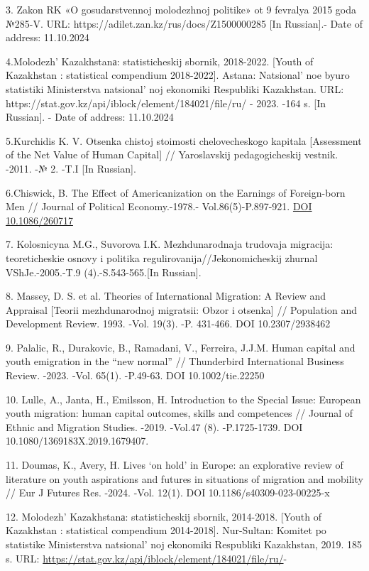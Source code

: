 3. Zakon RK «O gosudarstvennoj molodezhnoj politike» ot 9 fevralya 2015
goda №285-V. URL: https://adilet.zan.kz/rus/docs/Z1500000285 {[}In
Russian{]}.- Date of address: 11.10.2024

4.Molodezh'{} Kazakhstanа: statisticheskij sbornik,
2018-2022. {[}Youth of Kazakhstan : statistical compendium 2018-2022{]}.
Astana: Natsional' noe byuro statistiki Ministerstva
natsional' noj ekonomiki Respubliki Kazakhstan. URL:
https://stat.gov.kz/api/iblock/element/184021/file/ru/ - 2023. -164 s.
{[}In Russian{]}. - Date of address: 11.10.2024

5.Kurchidis K. V. Otsenka chistoj stoimosti chelovecheskogo kapitala
{[}Assessment of the Net Value of Human Capital{]} // Yaroslavskij
pedagogicheskij vestnik. -2011. -№ 2. -T.I {[}In Russian{]}.

6.Chiswick, B. The Effect of Americanization on the Earnings of
Foreign-born Men // Journal of Political Economy.-1978.-
Vol.86(5)-P.897-921.
\href{https://econpapers.repec.org/scripts/redir.pf?u=http\%3A\%2F\%2Fdx.doi.org\%2F10.1086\%2F260717;h=repec:ucp:jpolec:v:86:y:1978:i:5:p:897-921}{DOI
10.1086/260717}~

7. Kolosnicyna M.G., Suvorova I.K. Mezhdunarodnaja trudovaja migracija:
teoreticheskie osnovy i politika regulirovanija//Jekonomicheskij zhurnal
VShJe.-2005.-T.9 (4).-S.543-565.{[}In Russian{]}.

8. Massey, D. S. et al. Theories of International Migration: A Review
and Appraisal {[}Teorii mezhdunarodnoj migratsii: Obzor i otsenka{]} //
Population and Development Review. 1993. -Vol. 19(3). -P. 431-466. DOI
10.2307/2938462

9. Palalic, R., Durakovic, B., Ramadani, V., Ferreira, J.J.M. Human
capital and youth emigration in the ``new normal'' // Thunderbird
International Business Review. -2023. -Vol. 65(1). -P.49-63. DOI
10.1002/tie.22250

10. Lulle, A., Janta, H., Emilsson, H. Introduction to the Special
Issue: European youth migration: human capital outcomes, skills and
competences // Journal of Ethnic and Migration Studies. -2019. -Vol.47
(8). -P.1725-1739. DOI 10.1080/1369183X.2019.1679407.

11. Doumas, K., Avery, H. Lives `on hold' in Europe: an explorative
review of literature on youth aspirations and futures in situations of
migration and mobility // Eur J Futures Res. -2024. -Vol. 12(1). DOI
10.1186/s40309-023-00225-x

12. Molodezh'{} Kazakhstanа: statisticheskij sbornik,
2014-2018. {[}Youth of Kazakhstan : statistical compendium 2014-2018{]}.
Nur-Sultan: Komitet po statistike Ministerstva
natsional' noj ekonomiki Respubliki Kazakhstan, 2019. 185
s. URL: \url{https://stat.gov.kz/api/iblock/element/184021/file/ru/}-

